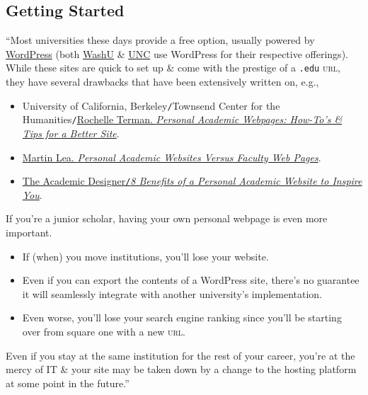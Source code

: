 \documentclass{article}
\numberwithin{equation}{section}
\begin{document}
\subsection{Getting Started}
``Most universities these days provide a free option, usually powered by \href{https://wordpress.org/}{WordPress} (both \href{https://sites.wustl.edu/}{WashU} \& \href{http://web.unc.edu/}{UNC} use WordPress for their respective offerings). While these sites are quick to set up \& come with the prestige of a \texttt{.edu} \textsc{url}, they have several drawbacks that have been extensively written on, e.g.,
\begin{itemize}
	\item University of California, Berkeley\texttt{/}Townsend Center for the Humanities\texttt{/}\href{https://townsendcenter.berkeley.edu/blog/personal-academic-webpages-how-tos-and-tips-better-site}{Rochelle Terman. \textit{Personal Academic Webpages: How-To's \& Tips for a Better Site}}.
	\item \href{https://martinlea.com/four-reasons-why-faculty-profile-pages-are-no-substitute-for-personal-academic-website/}{Martin Lea. \textit{Personal Academic Websites Versus Faculty Web Pages}}.
	\item \href{https://theacademicdesigner.com/2019/personal-academic-website-benefits/}{The Academic Designer\texttt{/}\textit{8 Benefits of a Personal Academic Website to Inspire You}}.
\end{itemize}
If you're a junior scholar, having your own personal webpage is even more important.
\begin{itemize}
	\item If (when) you move institutions, you'll lose your website.
	\item Even if you can export the contents of a WordPress site, there's no guarantee it will seamlessly integrate with another university's implementation.
	\item Even worse, you'll lose your search engine ranking since you'll be starting over from square one with a new \textsc{url}.
\end{itemize}
Even if you stay at the same institution for the rest of your career, you're at the mercy of IT \& your site may be taken down by a change to the hosting platform at some point in the future.''
\end{document}
